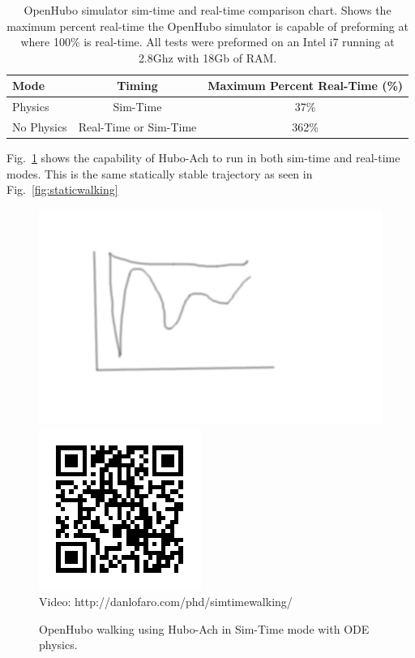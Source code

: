 \begin{table}
\centering
\caption{OpenHubo simulator sim-time and real-time comparison chart.  Shows the maximum percent real-time the OpenHubo simulator is capable of preforming at where 100\% is real-time.  All tests were preformed on an Intel i7 running at 2.8Ghz with 18Gb of RAM.}
\begin{tabular}{| l || c | c |}
\hline
Mode               & Timing                & Maximum Percent Real-Time (\%) \\
\hline
\hline
Physics            & Sim-Time              & 37\%   \\
\hline
No Physics         & Real-Time or Sim-Time & 362\%  \\
\hline
\end{tabular}\label{table:simtime}
\end{table}


Fig.~\ref{fig:visualservoing} shows the capability of Hubo-Ach to run in both sim-time and real-time modes.  
This is the same statically stable trajectory as seen in Fig.~\ref{fig:staticwalking}


\begin{figure}[thpb]
  \centering
      \includegraphics[width=0.93\columnwidth]{./pix/tmp.png}
      \includegraphics{./qrcode/qrcode-simtimewalking.png}\\
      Video: http://danlofaro.com/phd/simtimewalking/
\caption{OpenHubo walking using Hubo-Ach in Sim-Time mode with ODE physics.}
\label{fig:visualservoing}
\end{figure}

